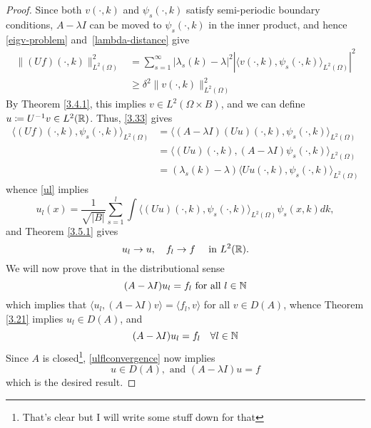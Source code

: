 \begin{theorem}
\begin{proof}
		Since both $v(\cdot, k)$ and $\psi_{s}(\cdot, k)$ satisfy semi-periodic boundary conditions, $A - \lambda I$ can be moved to $\psi_{s}(\cdot, k)$ in the inner product, and hence \eqref{eigv-problem} and \eqref{lambda-distance} give
		\begin{align*}
			\| (Uf)(\cdot,k)\|^{2}_{L^{2}(\Omega)} & = \sum_{s=1}^{\infty} |\lambda_{s}(k) - \lambda|^{2} |\langle v(\cdot, k), \psi_{s}(\cdot, k)\rangle_{L^{2}(\Omega)}|^{2} \\
			& \geq \delta^{2} \| v(\cdot, k)\|^{2}_{L^{2}(\Omega)}
		\end{align*}
		By Theorem \ref{3.4.1}, this implies $v \in L^{2}(\Omega \times B)$, and we can define $u \coloneqq U^{-1} v \in L^{2}(\mathbb{R})$. Thus, \eqref{3.33} gives
			\begin{align*}
				\langle (Uf)(\cdot, k), \psi_{s}(\cdot, k) \rangle_{L^{2}(\Omega)} & = \langle (A - \lambda I)(Uu)(\cdot, k), \psi_{s}(\cdot, k) \rangle_{L^{2}(\Omega)} \\
					& = \langle (Uu)(\cdot,k), (A - \lambda I) \psi_{s}(\cdot, k) \rangle_{L^{2}(\Omega)} \\
					& = (\lambda_{s}(k) - \lambda) \langle Uu(\cdot, k), \psi_{s}(\cdot, k) \rangle_{L^{2}(\Omega)}
			\end{align*}
		whence \eqref{ul} implies
			\[ u_{l}(x) = \frac{1}{\sqrt{|B|}} \sum_{s=1}^{l} \int \langle (Uu)(\cdot, k), \psi_{s}(\cdot, k)\rangle_{L^{2}(\Omega)} \psi_{s}(x, k) dk, \]
		and Theorem \ref{3.5.1} gives
			\begin{equation}
				u_{l} \rightarrow u, \quad f_{l} \rightarrow f \quad \text{ in } L^{2}(\mathbb{R}). \label{ulflconvergence}
			\end{equation}
		We will now prove that in the distributional sense 
		\begin{equation}
				(A - \lambda I) u_{l} = f_{l} \text{ for all } l \in \mathbb{N} \label{lefttoprove}
			\end{equation} 
		which implies that $\langle u_{l}, (A - \lambda I) v \rangle = \langle f_{l}, v\rangle$ for all $v \in D(A)$, whence Theorem \ref{3.21} implies $u_{l} \in D(A)$, and
			\[ (A - \lambda I) u_{l} = f_{l} \quad \forall l \in \mathbb{N} \]
		Since $A$ is closed\footnote{That's clear but I will write some stuff down for that}, \eqref{ulflconvergence} now implies %
			\[ u \in D(A), \text{ and } (A - \lambda I) u = f \]
		which is the desired result.
		

\end{proof}
\end{theorem}
